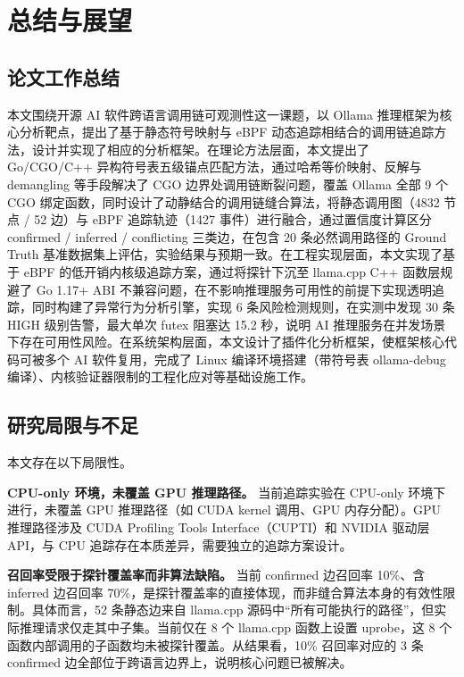 
\chapter{总结与展望}
\label{chap:conclusion}

\section{论文工作总结}

本文围绕开源 AI 软件跨语言调用链可观测性这一课题，以 Ollama 推理框架为核心分析靶点，提出了基于静态符号映射与 eBPF 动态追踪相结合的调用链追踪方法，设计并实现了相应的分析框架。在理论方法层面，本文提出了 Go/CGO/C++ 异构符号表五级锚点匹配方法，通过哈希等价映射、反解与 demangling 等手段解决了 CGO 边界处调用链断裂问题，覆盖 Ollama 全部 9 个 CGO 绑定函数，同时设计了动静结合的调用链缝合算法，将静态调用图（4832 节点 / 52 边）与 eBPF 追踪轨迹（1427 事件）进行融合，通过置信度计算区分 confirmed / inferred / conflicting 三类边，在包含 20 条必然调用路径的 Ground Truth 基准数据集上评估，实验结果与预期一致。在工程实现层面，本文实现了基于 eBPF 的低开销内核级追踪方案，通过将探针下沉至 llama.cpp C++ 函数层规避了 Go 1.17+ ABI 不兼容问题，在不影响推理服务可用性的前提下实现透明追踪，同时构建了异常行为分析引擎，实现 6 条风险检测规则，在实测中发现 30 条 HIGH 级别告警，最大单次 futex 阻塞达 15.2 秒，说明 AI 推理服务在并发场景下存在可用性风险。在系统架构层面，本文设计了插件化分析框架，使框架核心代码可被多个 AI 软件复用，完成了 Linux 编译环境搭建（带符号表 ollama-debug 编译）、内核验证器限制的工程化应对等基础设施工作。

\section{研究局限与不足}

本文存在以下局限性。

\textbf{CPU-only 环境，未覆盖 GPU 推理路径。} 当前追踪实验在 CPU-only 环境下进行，未覆盖 GPU 推理路径（如 CUDA kernel 调用、GPU 内存分配）。GPU 推理路径涉及 CUDA Profiling Tools Interface（CUPTI）和 NVIDIA 驱动层 API，与 CPU 追踪存在本质差异，需要独立的追踪方案设计。

\textbf{召回率受限于探针覆盖率而非算法缺陷。} 当前 confirmed 边召回率 10\%、含 inferred 边召回率 70\%，是探针覆盖率的直接体现，而非缝合算法本身的有效性限制。具体而言，52 条静态边来自 llama.cpp 源码中“所有可能执行的路径”，但实际推理请求仅走其中子集。当前仅在 8 个 llama.cpp 函数上设置 uprobe，这 8 个函数内部调用的子函数均未被探针覆盖。从结果看，10\% 召回率对应的 3 条 confirmed 边全部位于跨语言边界上，说明核心问题已被解决。

